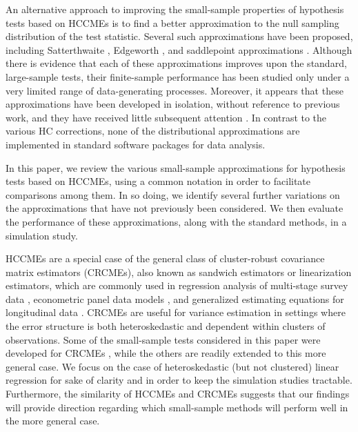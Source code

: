 \documentclass[12pt]{article}\usepackage[]{graphicx}\usepackage[]{color}
\begin{document}
An alternative approach to improving the small-sample properties of hypothesis tests based on HCCMEs is to find a better approximation to the null sampling distribution of the test statistic. 
Several such approximations have been proposed, including Satterthwaite \citep{Lipsitz1999degrees}, Edgeworth \citep{Rothenberg1988approximate, Kauermann2001note}, and saddlepoint approximations \citep{McCaffrey2006improved}. 
Although there is evidence that each of these approximations improves upon the standard, large-sample tests, their finite-sample performance has been studied only under a very limited range of data-generating processes. 
Moreover, it appears that these approximations have been developed in isolation, without reference to previous work, and they have received little subsequent attention \citep[e.g., none are discussed in a recent review of heteroskedasticity-robust inference by][]{MacKinnon2013thirty}. 
In contrast to the various HC corrections, none of the distributional approximations are implemented in standard software packages for data analysis. 

In this paper, we review the various small-sample approximations for hypothesis tests based on HCCMEs, using a common notation in order to facilitate comparisons among them. 
In so doing, we identify several further variations on the approximations that have not previously been considered. 
We then evaluate the performance of these approximations, along with the standard methods, in a simulation study. 

HCCMEs are a special case of the general class of cluster-robust covariance matrix estimators (CRCMEs), also known as sandwich estimators or linearization estimators, which are commonly used in regression analysis of multi-stage survey data \citep{Fuller1975regression, Skinner1989domain}, econometric panel data models \citep{white1984asymptotic, Arellano1987computing}, and generalized estimating equations for longitudinal data \citep{Liang1986longitudinal}. 
CRCMEs are useful for variance estimation in settings where the error structure is both heteroskedastic and dependent within clusters of observations.
Some of the small-sample tests considered in this paper were developed for CRCMEs \citep[i.e.,][]{Bell2002bias, McCaffrey2006improved}, while the others are readily extended to this more general case.
We focus on the case of heteroskedastic (but not clustered) linear regression for sake of clarity and in order to keep the simulation studies tractable. 
Furthermore, the similarity of HCCMEs and CRCMEs suggests that our findings will provide direction regarding which small-sample methods will perform well in the more general case.
\end{document}
